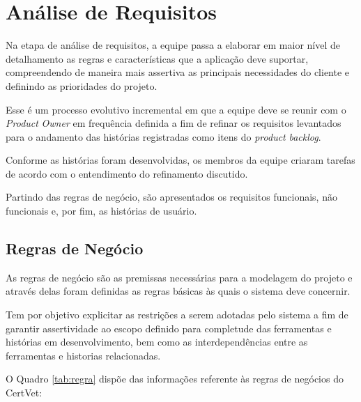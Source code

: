 \documentclass[
    12pt,               %
    openright,          %
    oneside,
    a4paper,            %
    BIBLATEX,           %
    TODO,               %
    english,            %
    brazil              %
    ]{ifsp-spo-inf-ctds}
\begin{document}
	
  



     
    \section{Análise de Requisitos}
    
        Na etapa de análise de requisitos, a equipe passa a elaborar em maior nível de detalhamento as regras e características que a aplicação deve suportar, compreendendo de maneira mais assertiva as principais necessidades do cliente e definindo as prioridades do projeto.
        
        Esse é um processo evolutivo incremental em que a equipe deve se reunir com o \emph{Product} \emph{Owner} em frequência definida a fim de refinar os requisitos levantados para o andamento das histórias registradas como itens do \emph{product} \emph{backlog}. 
        
        Conforme as histórias foram desenvolvidas, os membros da equipe criaram tarefas de acordo com o entendimento do refinamento discutido.
        
        Partindo das regras de negócio, são apresentados os requisitos funcionais, não funcionais e, por fim, as histórias de usuário.

         \subsection{Regras de Negócio}
        
            As regras de negócio são as premissas necessárias para a modelagem do projeto e através delas foram definidas as regras básicas às quais o sistema deve concernir.
            
            Tem por objetivo explicitar as restrições a serem adotadas pelo sistema a fim de garantir assertividade ao escopo definido para completude das ferramentas e histórias em desenvolvimento, bem como as interdependências entre as ferramentas e historias relacionadas.
            
            O Quadro \ref{tab:regra} dispõe das informações referente às regras de negócios do CertVet:
\end{document}
